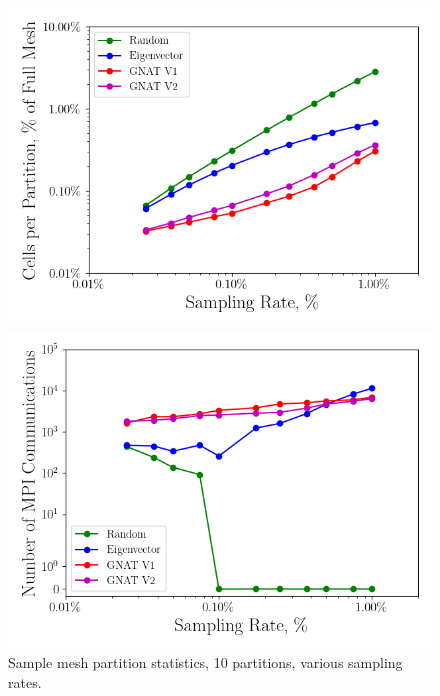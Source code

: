 \begin{figure}
	\begin{minipage}{0.49\linewidth}
		\includegraphics[width=0.99\linewidth]{Chapters/HPROMResults/Images/cvrc/deim/stats/cvrc_partition_stats.png}
	\end{minipage}
	\begin{minipage}{0.49\linewidth}
		\includegraphics[width=0.99\linewidth]{Chapters/HPROMResults/Images/cvrc/deim/stats/cvrc_partition_comms.png}
	\end{minipage}
	\caption{\label{fig:cvrcMeshStats}Sample mesh partition statistics, 10 partitions, various sampling rates.}
\end{figure}

